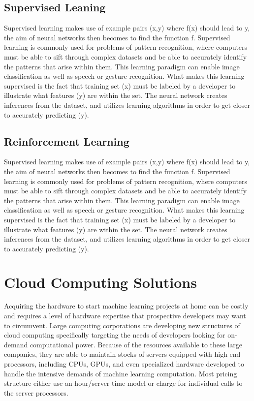 \documentclass[onecolumn, draftclsnofoot,10pt, compsoc]{IEEEtran}
\begin{document}
    \subsection{Supervised Leaning}
    Supervised learning makes use of example pairs (x,y) where f(x) should lead to y, the aim of neural networks then becomes to find the function f. Supervised learning is commonly used for problems of pattern recognition, where computers must be able to sift through complex datasets and be able to accurately identify the patterns that arise within them. This learning paradigm can enable image classification as well as speech or gesture recognition. What makes this learning supervised is the fact that training set (x) must be labeled by a developer to illustrate what features (y) are within the set. The neural network creates inferences from the dataset, and utilizes learning algorithms in order to get closer to accurately predicting (y).
    \subsection{Reinforcement Learning}
    Supervised learning makes use of example pairs (x,y) where f(x) should lead to y, the aim of neural networks then becomes to find the function f. Supervised learning is commonly used for problems of pattern recognition, where computers must be able to sift through complex datasets and be able to accurately identify the patterns that arise within them. This learning paradigm can enable image classification as well as speech or gesture recognition. What makes this learning supervised is the fact that training set (x) must be labeled by a developer to illustrate what features (y) are within the set. The neural network creates inferences from the dataset, and utilizes learning algorithms in order to get closer to accurately predicting (y).
    
    \section{Cloud Computing Solutions}
    Acquiring the hardware to start machine learning projects at home can be costly and requires a level of hardware expertise that prospective developers may want to circumvent. Large computing corporations are developing new structures of cloud computing specifically targeting the needs of developers looking for on-demand computational power. Because of the resources available to these large companies, they are able to maintain stocks of servers equipped with high end processors, including CPUs, GPUs, and even specialized hardware developed to handle the intensive demands of machine learning computation. Most pricing structure either use an hour/server time model or charge for individual calls to the server processors.
\end{document}
